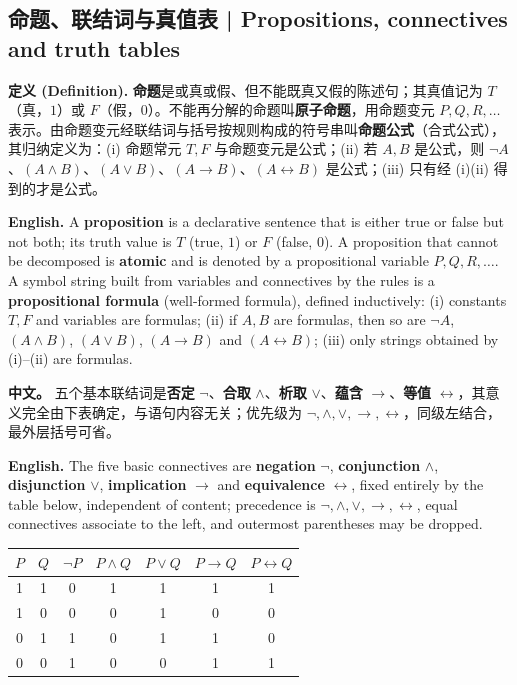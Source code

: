 \documentclass[UTF8,11pt,a4paper]{ctexart}
\newcommand{\EN}[1]{\par\noindent \textbf{English.} #1\par}
\newcommand{\APS}[2]{\par\noindent\textbf{中文。} #1\par\noindent\textbf{English.} #2\par}
\newcommand{\DEF}[2]{\par\noindent\textbf{定义 (Definition).} #1\par\EN{#2}}
\begin{document}
\subsection{命题、联结词与真值表 | Propositions, connectives and truth tables}
\DEF{\textbf{命题}是或真或假、但不能既真又假的陈述句；其真值记为 $T$（真，$1$）或 $F$（假，$0$）。不能再分解的命题叫\textbf{原子命题}，用命题变元 $P,Q,R,\dots$ 表示。由命题变元经联结词与括号按规则构成的符号串叫\textbf{命题公式}（合式公式），其归纳定义为：(i) 命题常元 $T,F$ 与命题变元是公式；(ii) 若 $A,B$ 是公式，则 $\neg A$、$(A\wedge B)$、$(A\vee B)$、$(A\to B)$、$(A\leftrightarrow B)$ 是公式；(iii) 只有经 (i)(ii) 得到的才是公式。}{A \textbf{proposition} is a declarative sentence that is either true or false but not both; its truth value is $T$ (true, $1$) or $F$ (false, $0$). A proposition that cannot be decomposed is \textbf{atomic} and is denoted by a propositional variable $P,Q,R,\dots$. A symbol string built from variables and connectives by the rules is a \textbf{propositional formula} (well-formed formula), defined inductively: (i) constants $T,F$ and variables are formulas; (ii) if $A,B$ are formulas, then so are $\neg A$, $(A\wedge B)$, $(A\vee B)$, $(A\to B)$ and $(A\leftrightarrow B)$; (iii) only strings obtained by (i)--(ii) are formulas.}
\APS{五个基本联结词是\textbf{否定} $\neg$、\textbf{合取} $\wedge$、\textbf{析取} $\vee$、\textbf{蕴含} $\to$、\textbf{等值} $\leftrightarrow$，其意义完全由下表确定，与语句内容无关；优先级为 $\neg,\wedge,\vee,\to,\leftrightarrow$，同级左结合，最外层括号可省。}{The five basic connectives are \textbf{negation} $\neg$, \textbf{conjunction} $\wedge$, \textbf{disjunction} $\vee$, \textbf{implication} $\to$ and \textbf{equivalence} $\leftrightarrow$, fixed entirely by the table below, independent of content; precedence is $\neg,\wedge,\vee,\to,\leftrightarrow$, equal connectives associate to the left, and outermost parentheses may be dropped.}
\begin{center}\small
\begin{tabular}{@{}ccccccc@{}}
\toprule
$P$ & $Q$ & $\neg P$ & $P\wedge Q$ & $P\vee Q$ & $P\to Q$ & $P\leftrightarrow Q$ \\
\midrule
1 & 1 & 0 & 1 & 1 & 1 & 1 \\
1 & 0 & 0 & 0 & 1 & 0 & 0 \\
0 & 1 & 1 & 0 & 1 & 1 & 0 \\
0 & 0 & 1 & 0 & 0 & 1 & 1 \\
\bottomrule
\end{tabular}
\end{center}
\end{document}
